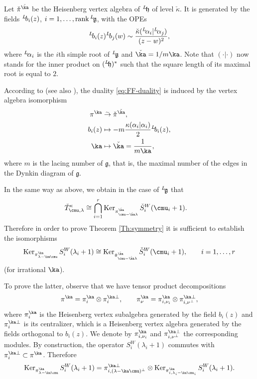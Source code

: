 \documentclass{amsart}
\newcommand{\on}{\operatorname}
\newcommand{\+}{\mathop{\oplus}}
\renewcommand{\*}{{\otimes}}
\newcommand{\mf}{\mathfrak}
\newcommand{\g}{\mf{g}}
\newcommand{\h}{\mf{h}}
\newcommand{\isomap}{{\;\stackrel{_\sim}{\to}\;}}
\newcommand{\lam}{\lambda}
\def\neg{\negthinspace}
\def\lg{{}^L\neg\g}
\def\lh{{}^L\neg\h}
\theoremstyle{theorem}
\theoremstyle{remark}
\numberwithin{equation}{section}
\begin{document}
Let $\check{\pi}^{\check\ka}$ be the Heisenberg vertex algebra of
$\lh$ of level $\check{\kappa}$. It is generated by the fields $^L\neg
b_i(z)$, $i=1,\dots, \on{rank}\lg$, with the OPEs
\begin{align}
{}^L\neg b_i(z){}^L\neg b_j(w)\sim
\frac{\check{\kappa}({}^L\neg \alpha_i|{}^L\neg
  \alpha_j)}{(z-w)^2}
\label{eq:Lb_i},
\end{align}
where ${}^L\neg \alpha_i$ is the $i$th simple root of $\lg$ and
$\check\ka=1/m\ka$. Note that $(\cdot|\cdot)$ now stands for the inner
product on $(\lh)^*$ such that the square length of its maximal root
is equal to $2$.

According to \cite{FF} (see also \cite{Fre05,FreBen04}), the duality
\eqref{eq:FF-duality} is induced by the vertex algebra isomorphism
\begin{align} \notag
\pi^\ka &\isomap \check{\pi}^{\check\ka}, \\    \label{checkpi}
b_i(z)&\mapsto -m\frac{\kappa(\alpha_i|\alpha_i)}{2}{}^L\neg b_i(z), \\
\ka &\mapsto \check\ka = \frac{1}{m\ka}, \notag
\end{align}
where $m$ is the lacing number of $\g$,
that is,
the maximal number of the edges in the Dynkin diagram of $\g$.

In the same way as above, we obtain in the case of $\lg$ that
\begin{align*}
&\check{T}^\kappa_{\cmu,\lam} \cong \bigcap_{i=1}^r
\on{Ker}_{\pi^{\check\ka}_{\cmu-\check\ka\lam}}
\check{S}^W_i(\cmu_i+1).
\end{align*}
Therefore in order to prove Theorem \ref{Th:symmetry} it is sufficient
to establish the isomorphisms
\begin{equation}    \label{Kers}
\on{Ker}_{\pi^\ka_{\lam-\ka\cmu}}
S^W_i(\lam_i+1) \cong \on{Ker}_{\check\pi^{\check\ka}_{\cmu-\check\ka\lam}}
\check{S}^W_i(\cmu_i+1), \qquad i=1,\dots,r
\end{equation}
(for irrational $\ka$).

To prove the latter, observe that we have tensor product decompositions
$$
\pi^\ka = \pi^\ka_i \otimes \pi^{\ka\perp}_i, \qquad \pi^\ka_\nu =
\pi^\ka_{i,\nu_i} \otimes \pi^{\ka\perp}_{i,\nu^\perp},
$$
where $\pi^\ka_i$ is the Heisenberg vertex subalgebra generated by the
field $b_i(z)$ and $\pi^{\ka\perp}_i$ is its centralizer, which is a
Heisenberg vertex algebra generated by the fields orthogonal to
$b_i(z)$. We denote by $\pi^\ka_{i,\nu_i}$ and
$\pi^{\ka\perp}_{i,\nu^\perp}$ the corresponding modules. By
construction, the operator $S^W_i(\lam_i+1)$ commutes with
$\pi^{\ka\perp}_i \subset \pi^\ka$. Therefore
$$
\on{Ker}_{\pi^\ka_{\lam-\ka\cmu}} S^W_i(\lam_i+1) =
\pi^{\ka\perp}_{i,(\lam-\ka\cmu)^\perp} \otimes
\on{Ker}_{\pi^\ka_{i,\lam_i-\ka\cmu_i}} S^W_i(\lam_i+1).
$$
\end{document}
